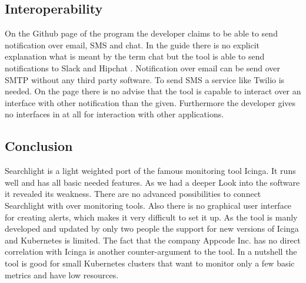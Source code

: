 \subsection{Interoperability}
On the Github page \cite{searchlight} of the program the developer claims to be able to send notification over email, SMS and chat.
In the guide there is no explicit explanation what is meant by the term chat but the tool is able to send notifications to Slack \cite{slack} and Hipchat \cite{hipchat}. Notification over email can be send over SMTP without any third party software. To send SMS a service like Twilio \cite{twilio} is needed.
On the page there is no advise that the tool is capable to interact over an interface with other notification than the given. Furthermore the developer gives no interfaces in at all for interaction with other applications.
\subsection{Conclusion}
Searchlight is a light weighted  port of the famous monitoring tool Icinga. It runs well and has all basic needed features. As we had a deeper Look  into the software  it revealed its weakness. There are no advanced possibilities to connect Searchlight with over monitoring tools. Also there is no graphical user interface for creating alerts, which makes it very difficult to set it up. As the tool is manly developed and updated by only two people the support for new versions of Icinga and Kubernetes is limited. The fact that the company Appcode Inc. has no direct correlation with Icinga is another counter-argument to the tool. In a nutshell the tool is good for small Kubernetes clusters that want to monitor only a few basic metrics and have low resources. 

